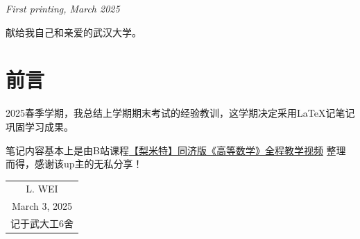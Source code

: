 \documentclass[
	11pt, %
	a4paper, %
]{WhuSakuraBook}
\begin{document}
\noindent \textit{First printing, March 2025}


    \begin{dedication}
        {\kaishu 献给我自己和亲爱的武汉大学。}
    \end{dedication}


\chapter*{前言}

    2025春季学期，我总结上学期期末考试的经验教训，这学期决定采用\LaTeX 记笔记巩固学习成果。

    笔记内容基本上是由B站课程\href{https://www.bilibili.com/video/BV1864y1T7Ks/}{【梨米特】同济版《高等数学》全程教学视频}
	整理而得，感谢该up主的无私分享！

    \vspace{1em}

    \begin{flushright}\begin{minipage}{0.3 \textwidth}
        \begin{tabular}{c}
        L. WEI \\
        March 3, 2025 \\
        记于武大工6舍
        \end{tabular}
    \end{minipage}\end{flushright}

\chapterspaceabove{6.5cm} %
\chapterspacebelow{6.75cm} %


\pagestyle{empty} %
\end{document}
